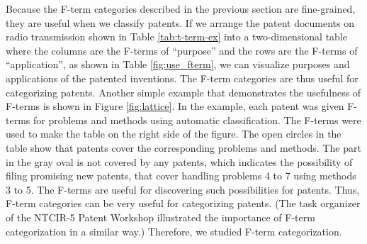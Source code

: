 \documentclass[english]{jnlp_1.2c}
\begin{document}
Because the F-term categories described in the previous section
are fine-grained,
they are useful when we classify patents. 
If we arrange the patent documents on radio transmission shown in Table \ref{tab:t-term-ex} 
into a two-dimensional table 
where the columns are
the F-terms of ``purpose'' and 
the rows are
the F-terms of ``application'', as shown in Table \ref{fig:use_fterm}, 
we can visualize 
purposes and applications of the patented inventions. 
The F-term categories are thus
useful for categorizing patents.
Another simple example that demonstrates the usefulness of F-terms 
is shown in Figure \ref{fig:lattice}.
In the example, each patent was given F-terms for problems and methods 
using automatic classification. 
The F-terms were used to make the table on the right side of the figure. 
The open circles in the table show that patents cover 
the corresponding problems and methods. 
The part in the gray oval is not covered by any patents, 
which indicates the possibility of filing promising new patents, 
that cover handling problems 4 to 7 using methods 3 to 5. 
The F-terms are useful for discovering such possibilities for patents. 
Thus, F-term categories can be very useful for categorizing patents. 
(The task organizer of the NTCIR-5 Patent Workshop \cite{Ntcir5_patent_2} 
illustrated the importance of F-term categorization in a similar way.)
Therefore, we studied F-term categorization. 
\end{document}

